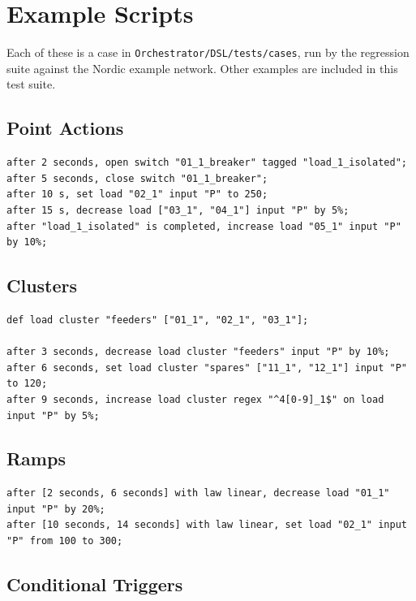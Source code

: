 \documentclass[12pt]{article}
\begin{document}
\section{Example Scripts}

Each of these is a case in \texttt{Orchestrator/DSL/tests/cases}, run by the regression suite against the Nordic example network. Other examples are included in this test suite.

\subsection{Point Actions}

\begin{lstlisting}
after 2 seconds, open switch "01_1_breaker" tagged "load_1_isolated";
after 5 seconds, close switch "01_1_breaker";
after 10 s, set load "02_1" input "P" to 250;
after 15 s, decrease load ["03_1", "04_1"] input "P" by 5%;
after "load_1_isolated" is completed, increase load "05_1" input "P" by 10%;
\end{lstlisting}

\subsection{Clusters}

\begin{lstlisting}
def load cluster "feeders" ["01_1", "02_1", "03_1"];

after 3 seconds, decrease load cluster "feeders" input "P" by 10%;
after 6 seconds, set load cluster "spares" ["11_1", "12_1"] input "P" to 120;
after 9 seconds, increase load cluster regex "^4[0-9]_1$" on load input "P" by 5%;
\end{lstlisting}

\subsection{Ramps}

\begin{lstlisting}
after [2 seconds, 6 seconds] with law linear, decrease load "01_1" input "P" by 20%;
after [10 seconds, 14 seconds] with law linear, set load "02_1" input "P" from 100 to 300;
\end{lstlisting}

\subsection{Conditional Triggers}
\end{document}
